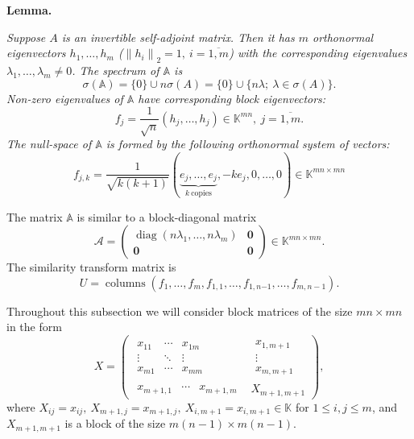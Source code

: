 \documentclass[a4paper]{jpconf}
\begin{document}
\textbf{Lemma.}
{\it
    Suppose \( A \) is an invertible self-adjoint matrix.
    Then it has \( m \) orthonormal eigenvectors \( h_1, \ldots, h_m \)
    (\(\left\|h_i\right\|_2 = 1,\ i{=}\overline{1,m}\))
    with the corresponding eigenvalues
    \( \lambda_1, \ldots, \lambda_m \neq 0\).
    The spectrum of \( \mathbb{A} \) is
    \[
        \sigma(\mathbb{A}) = \{0\}\cup n\sigma(A) = \{0\} \cup \{n\lambda;\ \lambda\in\sigma(A) \}.
    \]
    Non-zero eigenvalues of \( \mathbb{A} \)
        have corresponding block eigenvectors:
    \[
        f_j = \frac{1}{\sqrt{n}} (h_j, \ldots, h_j)\in \mathbb{K}^{mn},\ j=\overline{1,m}.
    \]
    The null-space of \( \mathbb{A} \)
        is formed by the following orthonormal system of vectors:
    \[
        f_{j,k} = \frac{1}{\sqrt{k(k+1)}}
        (
        \underbrace{e_j, \ldots, e_j}_{k\ \text{copies}},
        -ke_j,
        0, \ldots, 0
        ) \in\mathbb{K}^{{mn}{\times}{mn}}
    \]

    The matrix \( \mathbb{A} \) is similar to a block-diagonal matrix
    \[
        \mathcal{A} =
        \left(\begin{array}{c|c}
            \operatorname{diag}(n\lambda_1,\ldots,n\lambda_m) & \mathbf{0} \\ \hline
            \mathbf{0} & \mathbf{0}
        \end{array}\right)\in\mathbb{K}^{{mn}{\times}{mn}}.
    \]
    The similarity transform matrix is
    \[
        U = \operatorname{columns}
        \left(f_1, \ldots, f_m, f_{1,1}, \ldots, f_{1,n{-1}}, \ldots, f_{m,n{-}1}\right).
    \]
\/
}

Throughout this subsection
    we will consider block matrices
    of the size \( {mn}{\times}{mn} \)
    in the form
    \[
    X =
        \left(\begin{array}{c|c}
            \begin{matrix}
                x_{11} & \cdots & x_{1m} \\
                \vdots & \ddots & \vdots \\
                x_{m1} & \cdots & x_{mm}
            \end{matrix} &
            \begin{matrix}
                x_{1,m+1} \\
                \vdots \\
                x_{m,m+1}
            \end{matrix} \\ \hline
            \begin{matrix}
                x_{m+1,1} &
                \cdots &
                x_{m+1,m}
            \end{matrix} &
            X_{m+1,m+1}
        \end{array}\right),
    \]
where
\( X_{ij}      {=} x_{ij},
 \ X_{m{+}1,j} {=} x_{m{+}1,j},
 \ X_{i,m{+}1} {=} x_{i,m{+}1} \in \mathbb{K} \)
for \( 1 \leq {i,j} \leq m \),
and
\( X_{m{+}1,m{+}1} \) is a block of the size \( {m(n{-}1){\times}m(n-1)} \).
\end{document}
